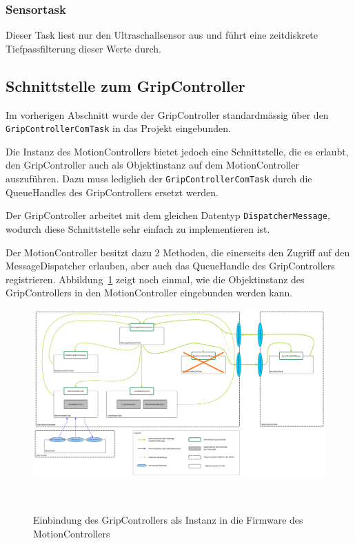 \documentclass[main.tex]{subfiles} %
\begin{document}
\subsubsection*{Sensortask}
Dieser Task liest nur den Ultraschallsensor aus und führt eine zeitdiskrete Tiefpassfilterung dieser Werte durch.

\subsection{Schnittstelle zum GripController}
Im vorherigen Abschnitt wurde der GripController standardmässig über den
\texttt{GripControllerComTask} in das Projekt eingebunden.

Die Instanz des MotionControllers bietet jedoch eine Schnittstelle, die es
erlaubt, den GripController auch als Objektinstanz auf dem MotionController
auszuführen. Dazu muss lediglich der \texttt{GripControllerComTask} durch die
QueueHandles des GripControllers ersetzt werden.

Der GripController arbeitet mit dem gleichen Datentyp
\texttt{DispatcherMessage}, wodurch diese Schnittstelle sehr einfach zu
implementieren ist.

Der MotionController besitzt dazu 2 Methoden, die einerseits den Zugriff auf
den MessageDispatcher erlauben, aber auch das QueueHandle des GripControllers
registrieren. Abbildung~\ref{fig:Einbindung_GripController_als_Instanz} zeigt
noch einmal, wie die Objektinstanz des GripControllers in den MotionController
eingebunden werden kann.

\begin{figure}[H]
    \centering
    \includegraphics[width=1\linewidth]{./fig_Firmware_MotionController/Einbindung_GripControllerQueues.pdf}
    \caption{Einbindung des GripControllers als Instanz in die Firmware des MotionControllers}~\label{fig:Einbindung_GripController_als_Instanz}
\end{figure}
\end{document}
